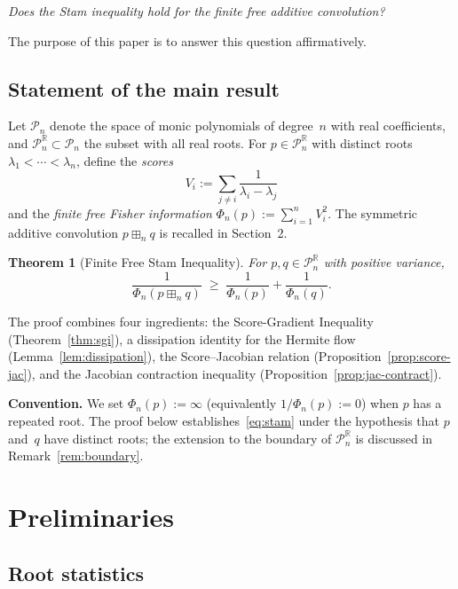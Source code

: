 \documentclass[11pt,a4paper]{amsart}
\theoremstyle{plain}
\newtheorem{theorem}{Theorem}[section]
\theoremstyle{definition}
\theoremstyle{remark}
\newcommand{\R}{\mathbb{R}}
\newcommand{\PnR}[1][n]{\mathcal{P}^{\R}_{#1}}
\newcommand{\fp}{\boxplus_n}
\begin{document}
\medskip
\emph{Does the Stam inequality hold for the finite free
additive convolution?}
\medskip

The purpose of this paper is to answer this question
affirmatively.

\subsection{Statement of the main result}

Let $\mathcal{P}_n$ denote the space of monic polynomials of
degree~$n$ with real coefficients, and
$\PnR\subset\mathcal{P}_n$ the subset with all real roots.
For $p\in\PnR$ with distinct roots
$\lambda_1<\cdots<\lambda_n$, define the \emph{scores}
\[
  V_i:=\sum_{j\ne i}\frac{1}{\lambda_i-\lambda_j}
\]
and the \emph{finite free Fisher information}
$\Phi_n(p):=\sum_{i=1}^n V_i^2$.
The symmetric additive convolution $p\fp q$ is recalled in
Section~2.

\begin{theorem}[Finite Free Stam Inequality]
\label{thm:main}
For $p,q\in\PnR$ with positive variance,
\begin{equation}\label{eq:stam}
  \frac{1}{\Phi_n(p\fp q)}
  \;\ge\;\frac{1}{\Phi_n(p)}+\frac{1}{\Phi_n(q)}.
\end{equation}
\end{theorem}

The proof combines four ingredients: the Score-Gradient
Inequality (Theorem~\ref{thm:sgi}), a dissipation identity
for the Hermite flow (Lemma~\ref{lem:dissipation}),
the Score--Jacobian relation
(Proposition~\ref{prop:score-jac}), and the Jacobian
contraction inequality
(Proposition~\ref{prop:jac-contract}).

\medskip\noindent
\textbf{Convention.}
We set $\Phi_n(p):=\infty$ (equivalently
$1/\Phi_n(p):=0$) when $p$ has a repeated root.
The proof below establishes~\eqref{eq:stam} under
the hypothesis that $p$ and~$q$ have distinct roots;
the extension to the boundary of $\PnR$ is discussed
in Remark~\ref{rem:boundary}.


\section{Preliminaries}

\subsection{Root statistics}
\end{document}
